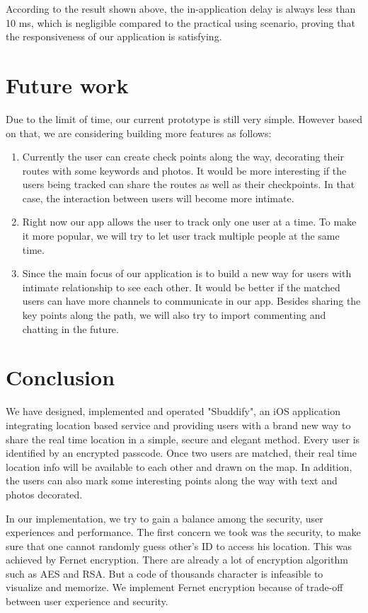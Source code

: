 \documentclass[journal]{IEEEtran}
\begin{document}
According to the result shown above, the in-application delay is always less than 10 ms, which is negligible compared to the practical using scenario, proving that the responsiveness of our application is satisfying.

\section{Future work}
Due to the limit of time, our current prototype is still very simple. However based on that, we are considering building more features as follows:
 
 \begin{enumerate}
 \item
Currently the user can create check points along the way, decorating their routes with some keywords and photos. It would be more interesting if the users being tracked can share the routes as well as their checkpoints. In that case, the interaction between users will become more intimate.
 \item
Right now our app allows the user to track only one user at a time. To make it more popular, we will try to let user track multiple people at the same time.
 \item
Since the main focus of our application is to build a new way for users with intimate relationship to see each other. It would be better if the matched users can have more channels to communicate in our app. Besides sharing the key points along the path, we will also try to import commenting and chatting in the future.
\end{enumerate}

\section{Conclusion}
We have designed, implemented and operated "Sbuddify", an iOS application integrating location based service and providing users with a brand new way to share the real time location in a simple, secure and elegant method. Every user is identified by an encrypted passcode. Once two users are matched, their real time location info will be available to each other and drawn on the map. In addition, the users can also mark some interesting points along the way with text and photos decorated.

In our implementation, we try to gain a balance among the security, user experiences and performance. The first concern we took was the security, to make sure that one cannot randomly guess other's ID to access his location. This was achieved by Fernet encryption. There are already a lot of encryption algorithm such as AES and RSA. But a code of thousands character is infeasible to visualize and memorize. We implement Fernet encryption because of trade-off between user experience and security. 
\end{document}
